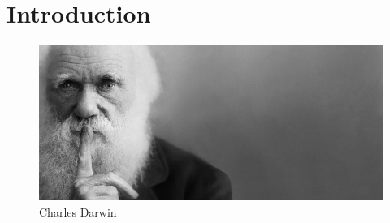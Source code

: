 \chapter{Introduction}

\begin{figure}
\includegraphics[width=\textwidth]{Images/DarwinWide.jpg}
\caption{Charles Darwin}
\end{figure}

